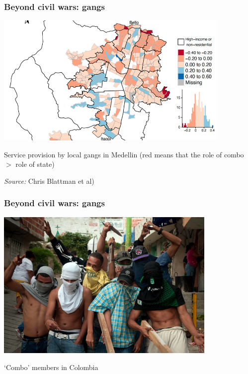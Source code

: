 \documentclass[utf8, xcolor=dvipsnames]{beamer}
\begin{document}
\begin{frame}
\frametitle{Beyond civil wars: gangs}
\centering

\includegraphics[width = 0.85\textwidth]{img/combo_governance_medelling}

Service provision by local gangs in Medellin (red means that the role of combo $>$ role of state)

\vspace{15pt}

{\footnotesize \textit{Source:} Chris Blattman et al)}

\end{frame}

\begin{frame}
\frametitle{Beyond civil wars: gangs}
\centering


\includegraphics[width = 0.8\textwidth]{img/combo}

\vspace{15pt}

`Combo' members in Colombia

\end{frame}
\end{document}
